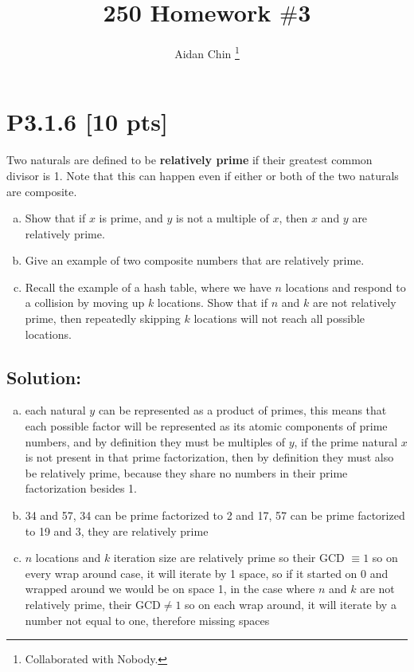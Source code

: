 \documentclass[12pt]{article}
\title{250 Homework $\#$3}
\author{Aidan Chin \footnote{Collaborated with Nobody.}}
\begin{document}
\maketitle

\section*{\textbf{P3.1.6} [10 pts]}
Two naturals are defined to be \textbf{relatively prime} if their greatest common divisor is 1. Note that this can happen even if either or both of the two naturals are composite.

\begin{enumerate}[(a)]
    \item Show that if $x$ is prime, and $y$ is not a multiple of $x$, then $x$ and $y$ are relatively prime.

    \item Give an example of two composite numbers that are relatively prime. 

    \item Recall the example of a hash table, where we have $n$ locations and respond to a collision by moving up $k$ locations. Show that if $n$ and $k$ are not relatively prime, then repeatedly skipping $k$ locations will not reach all possible locations.
    
\end{enumerate}

\subsection*{\textbf{Solution:}}
\begin{enumerate}[(a)]
    \item each natural $y$ can be represented as a product of primes, this means that each possible factor will be represented as its atomic components of prime numbers, and by definition they must be multiples of $y$, if the prime natural $x$ is not present in that prime factorization, then by definition they must also be relatively prime, because they share no numbers in their prime factorization besides 1.

    \item 34 and 57, 34 can be prime factorized to 2 and 17, 57 can be prime factorized to 19 and 3, they are relatively prime

    \item $n$ locations and $k$ iteration size are relatively prime so their GCD $\equiv 1$ so on every wrap around case, it will iterate by 1 space, so if it started on 0 and wrapped around we would be on space 1, in the case where $n$ and $k$ are not relatively prime, their GCD$\neq 1$ so on each wrap around, it will iterate by a number not equal to one, therefore missing spaces
    
\end{enumerate}
\end{document}
